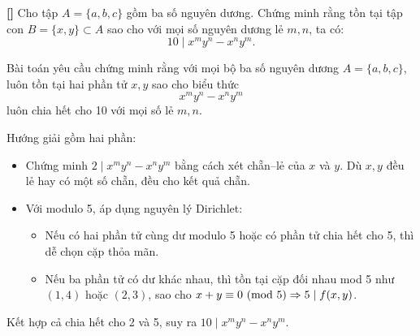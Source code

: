 \documentclass[../05-modular-arithmetic-a.tex]{subfiles}
\begin{document}
\begin{example*}\label{example:EGMO-2015-P1}\textbf{[]}
	Cho tập \( A = \{a, b, c\} \) gồm ba số nguyên dương.
	Chứng minh rằng tồn tại tập con \( B = \{x, y\} \subset A \) sao cho với mọi số nguyên dương lẻ \( m, n \), ta có:
	\[
		10 \mid x^m y^n - x^n y^m.
	\]
\end{example*}

\begin{story*}
    Bài toán yêu cầu chứng minh rằng với mọi bộ ba số nguyên dương \( A = \{a, b, c\} \), luôn tồn tại hai phần tử \( x, y \) sao cho biểu thức
    \[
        x^m y^n - x^n y^m
    \]
    luôn chia hết cho 10 với mọi số lẻ \( m, n \).

    Hướng giải gồm hai phần:
    \begin{itemize}[topsep=0pt, partopsep=0pt, itemsep=0pt]
        \item Chứng minh \( 2 \mid x^m y^n - x^n y^m \) bằng cách xét chẵn–lẻ của \( x \) và \( y \). Dù \( x, y \) đều lẻ hay có một số chẵn, đều cho kết quả chẵn.
        \item Với modulo 5, áp dụng nguyên lý Dirichlet:
        \begin{itemize}[topsep=0pt, partopsep=0pt, itemsep=0pt]
            \item Nếu có hai phần tử cùng dư modulo 5 hoặc có phần tử chia hết cho 5, thì dễ chọn cặp thỏa mãn.
            \item Nếu ba phần tử có dư khác nhau, thì tồn tại cặp đối nhau mod 5 như \( (1, 4) \) hoặc \( (2, 3) \), sao cho \( x + y \equiv 0 \ (\mathrm{mod}\ 5) \Rightarrow 5 \mid f(x, y) \).
        \end{itemize}
    \end{itemize}

    Kết hợp cả chia hết cho 2 và 5, suy ra \( 10 \mid x^m y^n - x^n y^m \).
\end{story*}

\bigbreak
\end{document}

